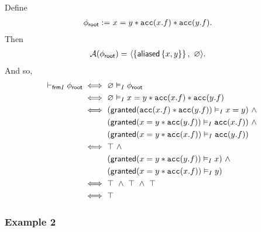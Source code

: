 Define
\begin{align*}
{\phi_\textsf{root}} := & \ x = y \ast \texttt{acc}(x.f) \ast \texttt{acc}(y.f).
\end{align*}
Then
\begin{align*}
\mathcal{A}({\phi_\textsf{root}}) = & \ \langle  \left\{ \textsf{aliased}\left\{ x,y \right\} \right\}  ,\  \varnothing  \rangle.
\end{align*}
And so,
\begin{align*}
\vdash_{\textsf{frm}I} {\phi_\textsf{root}}
\iff & \
\varnothing \vDash_I {\phi_\textsf{root}}
\\ \iff & \
\varnothing \vDash_I x = y \ast \texttt{acc}(x.f) \ast \texttt{acc}(y.f)
\\ \iff & \
( \textsf{granted}(\texttt{acc}(x.f) \ast \texttt{acc}(y.f)) \vDash_I x = y ) \ \land \\ & \
( \textsf{granted}(x = y \ast \texttt{acc}(y.f)) \vDash_I \texttt{acc}(x.f) ) \ \land \\ & \
( \textsf{granted}(x = y \ast \texttt{acc}(x.f)) \vDash_I \texttt{acc}(y.f) )
\\ \iff & \
\top \ \land \\ & \
( \textsf{granted}(x = y \ast \texttt{acc}(y.f)) \vDash_I x ) \ \land \\ & \
( \textsf{granted}(x = y \ast \texttt{acc}(x.f)) \vDash_I y )
\\ \iff & \
\top \ \land \ \top \ \land \ \top
\\ \iff & \
\top
\end{align*}

\newpage
\subsubsection*{Example 2}

